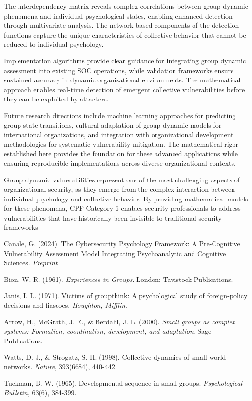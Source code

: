 \documentclass[11pt,a4paper]{article}
\begin{document}
The interdependency matrix reveals complex correlations between group dynamic phenomena and individual psychological states, enabling enhanced detection through multivariate analysis. The network-based components of the detection functions capture the unique characteristics of collective behavior that cannot be reduced to individual psychology.

Implementation algorithms provide clear guidance for integrating group dynamic assessment into existing SOC operations, while validation frameworks ensure sustained accuracy in dynamic organizational environments. The mathematical approach enables real-time detection of emergent collective vulnerabilities before they can be exploited by attackers.

Future research directions include machine learning approaches for predicting group state transitions, cultural adaptation of group dynamic models for international organizations, and integration with organizational development methodologies for systematic vulnerability mitigation. The mathematical rigor established here provides the foundation for these advanced applications while ensuring reproducible implementations across diverse organizational contexts.

Group dynamic vulnerabilities represent one of the most challenging aspects of organizational security, as they emerge from the complex interaction between individual psychology and collective behavior. By providing mathematical models for these phenomena, CPF Category 6 enables security professionals to address vulnerabilities that have historically been invisible to traditional security frameworks.

\begin{thebibliography}{9}

Canale, G. (2024). The Cybersecurity Psychology Framework: A Pre-Cognitive Vulnerability Assessment Model Integrating Psychoanalytic and Cognitive Sciences. \textit{Preprint}.

Bion, W. R. (1961). \textit{Experiences in Groups}. London: Tavistock Publications.

Janis, I. L. (1971). Victims of groupthink: A psychological study of foreign-policy decisions and fiascoes. \textit{Houghton, Mifflin}.

Arrow, H., McGrath, J. E., \& Berdahl, J. L. (2000). \textit{Small groups as complex systems: Formation, coordination, development, and adaptation}. Sage Publications.

Watts, D. J., \& Strogatz, S. H. (1998). Collective dynamics of small-world networks. \textit{Nature}, 393(6684), 440-442.

Tuckman, B. W. (1965). Developmental sequence in small groups. \textit{Psychological Bulletin}, 63(6), 384-399.

\end{thebibliography}
\end{document}
